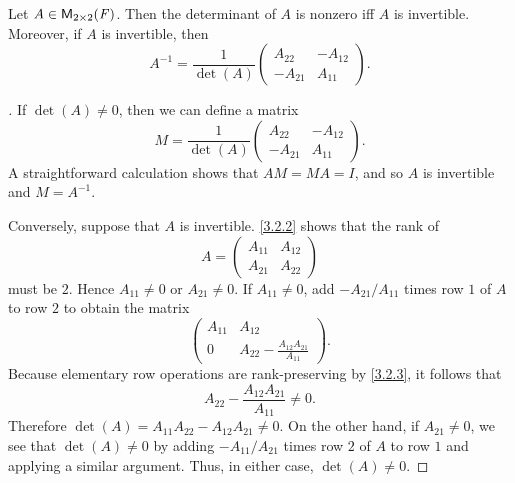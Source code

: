 \begin{thm}\label{4.2}
  Let \(A \in \ms[2][2][\F]\).
  Then the determinant of \(A\) is nonzero iff \(A\) is invertible.
  Moreover, if \(A\) is invertible, then
  \[
    A^{-1} = \frac{1}{\det(A)} \begin{pmatrix}
      A_{2 2}  & -A_{1 2} \\
      -A_{2 1} & A_{1 1}
    \end{pmatrix}.
  \]
\end{thm}

\begin{proof}[]
  If \(\det(A) \neq 0\), then we can define a matrix
  \[
    M = \frac{1}{\det(A)} \begin{pmatrix}
      A_{2 2}  & -A_{1 2} \\
      -A_{2 1} & A_{1 1}
    \end{pmatrix}.
  \]
  A straightforward calculation shows that \(AM = MA = I\), and so \(A\) is invertible and \(M = A^{-1}\).

  Conversely, suppose that \(A\) is invertible.
  \cref{3.2.2} shows that the rank of
  \[
    A = \begin{pmatrix}
      A_{1 1} & A_{1 2} \\
      A_{2 1} & A_{2 2}
    \end{pmatrix}
  \]
  must be \(2\).
  Hence \(A_{1 1} \neq 0\) or \(A_{2 1} \neq 0\).
  If \(A_{1 1} \neq 0\), add \(-A_{2 1} / A_{1 1}\) times row \(1\) of \(A\) to row \(2\) to obtain the matrix
  \[
    \begin{pmatrix}
      A_{1 1} & A_{1 2}                                   \\
      0       & A_{2 2} - \frac{A_{1 2} A_{2 1}}{A_{1 1}}
    \end{pmatrix}.
  \]
  Because elementary row operations are rank-preserving by \cref{3.2.3}, it follows that
  \[
    A_{2 2} - \frac{A_{1 2} A_{2 1}}{A_{1 1}} \neq 0.
  \]
  Therefore \(\det(A) = A_{1 1} A_{2 2} - A_{1 2} A_{2 1} \neq 0\).
  On the other hand, if \(A_{2 1} \neq 0\), we see that \(\det(A) \neq 0\) by adding \(-A_{1 1} / A_{2 1}\) times row \(2\) of \(A\) to row \(1\) and applying a similar argument.
  Thus, in either case, \(\det(A) \neq 0\).
\end{proof}

